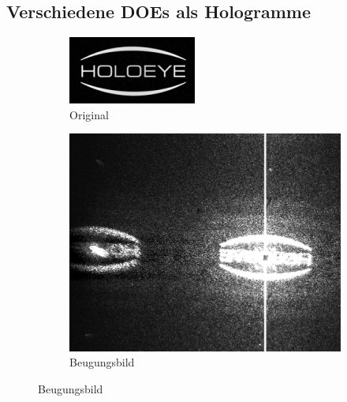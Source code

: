 \documentclass[
	a4paper,
	12pt,
	pagesize,
	ngerman
]{scrartcl}
\begin{document}
		\subsection{Verschiedene DOEs als Hologramme}

\begin{figure}[H]
        \centering
        \begin{subfigure}[b]{0.300\textwidth}
            \centering
            \includegraphics[width=\textwidth]{raw/holoeye_org}
            \caption%
            {Original}
            \label{fig_holoeye_org}
        \end{subfigure}
				\quad
        \begin{subfigure}[b]{0.475\textwidth}
            \centering
            \includegraphics[width=\textwidth]{raw/holoeye}
            \caption%
            {Beugungsbild}
            \label{fig_holoeye}

\end{subfigure}
\end{figure}
\end{document}
